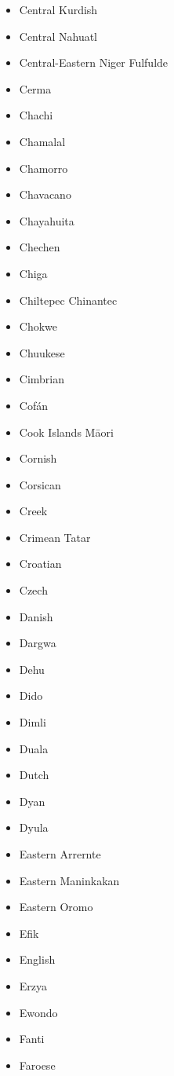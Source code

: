 \documentclass[paper=a4, 10pt]{scrbook}
\begin{document}
\begin{multicols}{3}
\begin{itemize}
        \item Central Kurdish
        \item Central Nahuatl
        \item Central-Eastern Niger Fulfulde
        \item Cerma
        \item Chachi
        \item Chamalal
        \item Chamorro
        \item Chavacano
        \item Chayahuita
        \item Chechen
        \item Chiga
        \item Chiltepec Chinantec
        \item Chokwe
        \item Chuukese
        \item Cimbrian
        \item Cofán
        \item Cook Islands Māori
        \item Cornish
        \item Corsican
        \item Creek
        \item Crimean Tatar
        \item Croatian
        \item Czech
        \item Danish
        \item Dargwa
        \item Dehu
        \item Dido
        \item Dimli
        \item Duala
        \item Dutch
        \item Dyan
        \item Dyula
        \item Eastern Arrernte
        \item Eastern Maninkakan
        \item Eastern Oromo
        \item Efik
        \item English
        \item Erzya
        \item Ewondo
        \item Fanti
        \item Faroese

\end{itemize}
\end{multicols}
\end{document}
